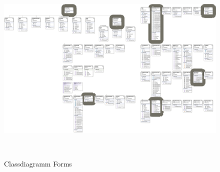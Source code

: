 \documentclass[12pt]{article}
\begin{document}
  \begin{figure}[ht]

  	\centering
  	\includegraphics[width=0.9\paperwidth, keepaspectratio=true]{ClassDiagramForms.pdf}
  	\caption{Classdiagramm Forms}\label{classdiagram}\
  \end{figure}
\end{document}
